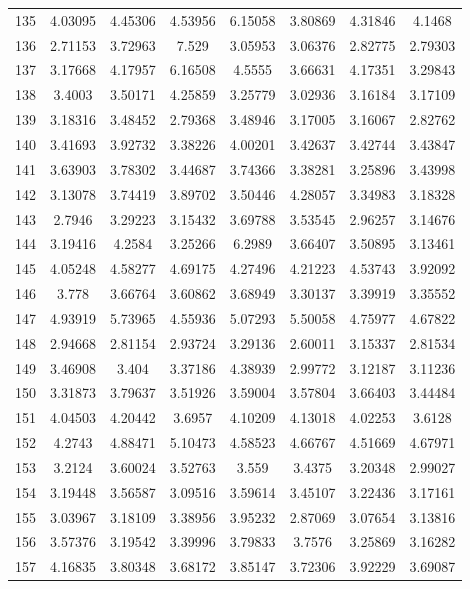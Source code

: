 \begin{center}
\begin{longtable}{cccccccc}
135 & 4.03095 & 4.45306 & 4.53956 & 6.15058 & 3.80869 & 4.31846 & 4.1468\\
136 & 2.71153 & 3.72963 & 7.529 & 3.05953 & 3.06376 & 2.82775 & 2.79303\\
137 & 3.17668 & 4.17957 & 6.16508 & 4.5555 & 3.66631 & 4.17351 & 3.29843\\
138 & 3.4003 & 3.50171 & 4.25859 & 3.25779 & 3.02936 & 3.16184 & 3.17109\\
139 & 3.18316 & 3.48452 & 2.79368 & 3.48946 & 3.17005 & 3.16067 & 2.82762\\
140 & 3.41693 & 3.92732 & 3.38226 & 4.00201 & 3.42637 & 3.42744 & 3.43847\\
141 & 3.63903 & 3.78302 & 3.44687 & 3.74366 & 3.38281 & 3.25896 & 3.43998\\
142 & 3.13078 & 3.74419 & 3.89702 & 3.50446 & 4.28057 & 3.34983 & 3.18328\\
143 & 2.7946 & 3.29223 & 3.15432 & 3.69788 & 3.53545 & 2.96257 & 3.14676\\
144 & 3.19416 & 4.2584 & 3.25266 & 6.2989 & 3.66407 & 3.50895 & 3.13461\\
145 & 4.05248 & 4.58277 & 4.69175 & 4.27496 & 4.21223 & 4.53743 & 3.92092\\
146 & 3.778 & 3.66764 & 3.60862 & 3.68949 & 3.30137 & 3.39919 & 3.35552\\
147 & 4.93919 & 5.73965 & 4.55936 & 5.07293 & 5.50058 & 4.75977 & 4.67822\\
148 & 2.94668 & 2.81154 & 2.93724 & 3.29136 & 2.60011 & 3.15337 & 2.81534\\
149 & 3.46908 & 3.404 & 3.37186 & 4.38939 & 2.99772 & 3.12187 & 3.11236\\
150 & 3.31873 & 3.79637 & 3.51926 & 3.59004 & 3.57804 & 3.66403 & 3.44484\\
151 & 4.04503 & 4.20442 & 3.6957 & 4.10209 & 4.13018 & 4.02253 & 3.6128\\
152 & 4.2743 & 4.88471 & 5.10473 & 4.58523 & 4.66767 & 4.51669 & 4.67971\\
153 & 3.2124 & 3.60024 & 3.52763 & 3.559 & 3.4375 & 3.20348 & 2.99027\\
154 & 3.19448 & 3.56587 & 3.09516 & 3.59614 & 3.45107 & 3.22436 & 3.17161\\
155 & 3.03967 & 3.18109 & 3.38956 & 3.95232 & 2.87069 & 3.07654 & 3.13816\\
156 & 3.57376 & 3.19542 & 3.39996 & 3.79833 & 3.7576 & 3.25869 & 3.16282\\
157 & 4.16835 & 3.80348 & 3.68172 & 3.85147 & 3.72306 & 3.92229 & 3.69087\\

\end{longtable}
\end{center}
